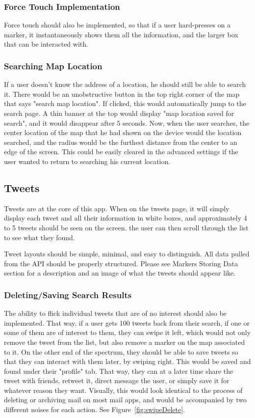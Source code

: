 \documentclass[11pt]{article}
\begin{document}
\subsubsection{Force Touch Implementation}
Force touch should also be implemented, so that if a user hard-presses on a marker, it instantaneously shows them all the information, and the larger box that can be interacted with.

\subsubsection{Searching Map Location}
If a user doesn't know the address of a location, he should still be able to search it. There would be an unobstructive button in the top right corner of the map that says "search map location". If clicked, this would automatically jump to the search page. A thin banner at the top would display "map location saved for search", and it would disappear after 5 seconds. Now, when the user searches, the center location of the map that he had shown on the device would the location searched, and the radius would be the furthest distance from the center to an edge of the screen. This could be easily cleared in the advanced settings if the user wanted to return to searching his current location.

\subsection{Tweets}
Tweets are at the core of this app. When on the tweets page, it will simply display each tweet and all their information in white boxes, and approximately 4 to 5 tweets should be seen on the screen. the user can then scroll through the list to see what they found.

Tweet layouts should be simple, minimal, and easy to distinguish. All data pulled from the API should be properly structured. Please see Markers Storing Data section for a description and an image of what the tweets should appear like.


\subsubsection{Deleting/Saving Search Results}
The ability to flick individual tweets that are of no interest should also be implemented. That way, if a user gets 100 tweets back from their search, if one or some of them are of interest to them, they can swipe it left, which would not only remove the tweet from the list, but also remove a marker on the map associated to it. On the other end of the spectrum, they should be able to save tweets so that they can interact with them later, by swiping right. This would be saved and found under their "profile" tab. That way, they can at a later time share the tweet with friends, retweet it, direct message the user, or simply save it for whatever reason they want. Visually, this would look identical to the process of deleting or archiving mail on most mail apps, and would be accompanied by two different noises for each action. See Figure~\ref{fig:swipeDelete}.
\end{document}
